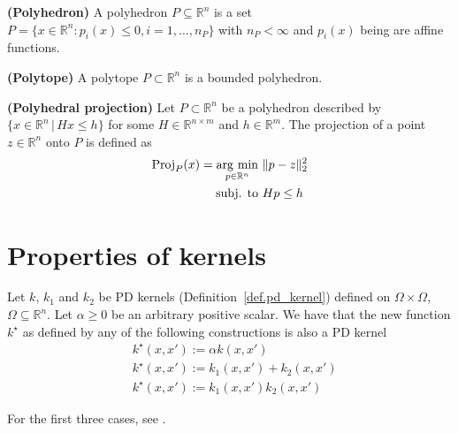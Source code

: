 \begin{definition}
	\textbf{(Polyhedron)}
	A polyhedron $P \subseteq \mathbb{R}^n$ is a set $P = \{x \in \mathbb{R}^n : p_i(x) \leq 0, i=1,\dots,n_P\}$ with $n_P < \infty$ and $p_i(x)$ being are affine functions.
\end{definition}

\begin{definition}
	\textbf{(Polytope)}
	A polytope $P \subset \mathbb{R}^n$ is a bounded polyhedron.
\end{definition}

\begin{definition}
	\textbf{(Polyhedral projection)}
	Let $P \subset \mathbb{R}^n$ be a polyhedron described by $\{x \in \mathbb{R}^n \, | \, H x \leq h \}$ for some $H \in \mathbb{R}^{n \times m}$ and $h \in \mathbb{R}^{m}$. The projection of a point $z \in \mathbb{R}^n$ onto $P$ is defined as
	\begin{align}
		\label{def.pol_proj}
		\text{Proj}_P(x) = \operatorname*{\arg\,\min}_{p \in \mathbb{R}^n} \ &\Vert p - z \Vert_2^2 \\
		\text{subj. to} \ & H p \leq h \nonumber
	\end{align}
\end{definition}






\chapter{Properties of kernels}

Let $k$, $k_1$ and $k_2$ be PD kernels (Definition~\ref{def.pd_kernel}) defined on $\Omega \times \Omega$, $\Omega \subseteq \mathbb{R}^n$. Let $\alpha \geq 0$ be an arbitrary positive scalar. We have that the new function $k^\star$ as defined by any of the following constructions is also a PD kernel
\begin{align}
	& k^\star(x,x') := \alpha k(x,x') \\
	& k^\star(x,x') := k_1(x,x') + k_2(x,x') \\
	& k^\star(x,x') := k_1(x,x') k_2(x,x') 
\end{align}

\begin{my_proof}
	For the first three cases, see \cite[§4]{steinwart2008svm_book}.
\end{my_proof}

